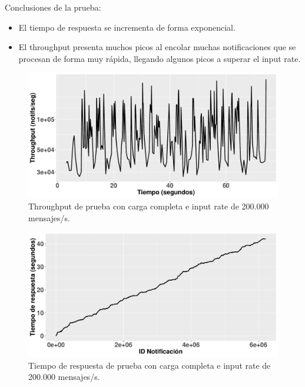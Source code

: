 Conclusiones de la prueba:
\begin{itemize}
    \item El tiempo de respuesta se incrementa de forma exponencial.
    \item El throughput presenta muchos picos al encolar muchas notificaciones que
    se procesan de forma muy rápida, llegando algunos picos a superar el input rate.
\end{itemize}

\begin{figure}[htpb]
    \centering
    \includegraphics[width=\textwidth]{images/full-worklad-inc-msgrate/th_full-workload-inc-msgrate_200k.pdf}
    \caption{Throughput de prueba con carga completa e input rate de 200.000 mensajes/s.}
    \label{fig:fullworkload-inc-msgrate-th-200k}
\end{figure}

\begin{figure}[htpb]
    \centering
    \includegraphics[width=\textwidth]{images/full-worklad-inc-msgrate/rt_full-workload-inc-msgrate_200k.pdf}
    \caption{Tiempo de respuesta de prueba con carga completa e input rate de 200.000 mensajes/s.}
    \label{fig:fullworkload-inc-msgrate-rt-200k}
\end{figure}

